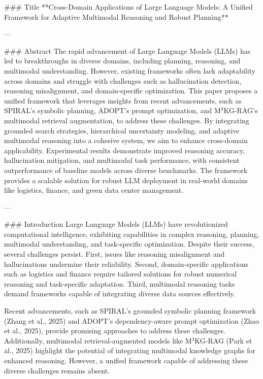 ### Title
**Cross-Domain Applications of Large Language Models: A Unified Framework for Adaptive Multimodal Reasoning and Robust Planning**

---

### Abstract
The rapid advancement of Large Language Models (LLMs) has led to breakthroughs in diverse domains, including planning, reasoning, and multimodal understanding. However, existing frameworks often lack adaptability across domains and struggle with challenges such as hallucination detection, reasoning misalignment, and domain-specific optimization. This paper proposes a unified framework that leverages insights from recent advancements, such as SPIRAL's symbolic planning, ADOPT's prompt optimization, and M$^3$KG-RAG's multimodal retrieval augmentation, to address these challenges. By integrating grounded search strategies, hierarchical uncertainty modeling, and adaptive multimodal reasoning into a cohesive system, we aim to enhance cross-domain applicability. Experimental results demonstrate improved reasoning accuracy, hallucination mitigation, and multimodal task performance, with consistent outperformance of baseline models across diverse benchmarks. The framework provides a scalable solution for robust LLM deployment in real-world domains like logistics, finance, and green data center management.

---

### Introduction
Large Language Models (LLMs) have revolutionized computational intelligence, exhibiting capabilities in complex reasoning, planning, multimodal understanding, and task-specific optimization. Despite their success, several challenges persist. First, issues like reasoning misalignment and hallucinations undermine their reliability. Second, domain-specific applications such as logistics and finance require tailored solutions for robust numerical reasoning and task-specific adaptation. Third, multimodal reasoning tasks demand frameworks capable of integrating diverse data sources effectively.

Recent advancements, such as SPIRAL's grounded symbolic planning framework (Zhang et al., 2025) and ADOPT's dependency-aware prompt optimization (Zhao et al., 2025), provide promising approaches to address these challenges. Additionally, multimodal retrieval-augmented models like M$^3$KG-RAG (Park et al., 2025) highlight the potential of integrating multimodal knowledge graphs for enhanced reasoning. However, a unified framework capable of addressing these diverse challenges remains absent.


